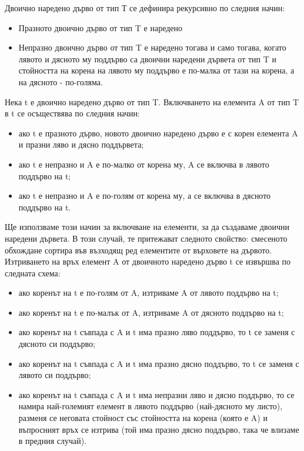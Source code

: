 \documentclass{article}
\renewcommand{\\}{\newline}
\begin{document}
Двоично наредено дърво от тип Т се дефинира рекурсивно по следния начин:

\begin{itemize}
    \item Празното двоично дърво от тип T е наредено
    \item Непразно двоично дърво от тип T е наредено тогава и само тогава, когато лявото и дясното му поддърво са двоични наредени дървета от тип T и стойността на корена на лявото му поддърво е по-малка от тази на корена, а на дясното - по-голяма.
\end{itemize} 

Нека t е двоично наредено дърво от тип T. Включването на елемента A от тип T в t се осъществява по следния начин:
\begin{itemize}
  \item  ако t е празното дърво, новото двоично наредено дърво е с корен елемента A и празни ляво и дясно поддървета;
  \item  ако t е непразно и A е по-малко от корена му, A се включва в лявото поддърво на t;
  \item  ако t е непразно и A е по-голям от корена му, а се включва в дясното поддърво на t.
\end{itemize}

Ще използваме този начин за включване на елементи, за да създаваме двоични наредени дървета. В този случай, те
притежават следното свойство: смесеното обхождане сортира във възходящ ред елементите от върховете на дървото.
Изтриването на връх елемент A от двоичното наредено дърво t се извършва по следната схема:
\begin{itemize}
  \item ако коренът на t е по-голям от A, изтриваме A от лявото поддърво на t;
  \item ако коренът на t е по-малък от A, изтриваме A от дясното поддърво на t;
  \item ако коренът на t съвпада с A и t има празно ляво поддърво, то t се заменя с дясното си поддърво;
  \item ако коренът на t съвпада с A и t има празно дясно поддърво, то t се заменя с лявото си поддърво;
  \item ако коренът на t съвпада с A и t има непразни ляво и дясно поддърво, то се намира най-големият елемент в лявото поддърво (най-дясното му листо), разменя се неговата стойност със стойността на корена (която е A) и въпросният връх се изтрива (той има празно дясно поддърво, така че влизаме в предния случай).
\end{itemize}
\end{document}
